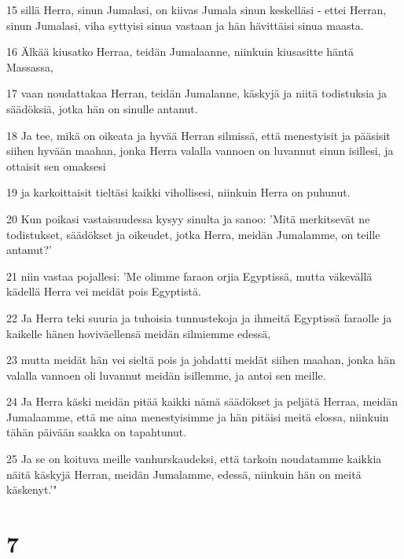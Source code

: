 \par 15 sillä Herra, sinun Jumalasi, on kiivas Jumala sinun keskelläsi - ettei Herran, sinun Jumalasi, viha syttyisi sinua vastaan ja hän hävittäisi sinua maasta.
\par 16 Älkää kiusatko Herraa, teidän Jumalaanne, niinkuin kiusasitte häntä Massassa,
\par 17 vaan noudattakaa Herran, teidän Jumalanne, käskyjä ja niitä todistuksia ja säädöksiä, jotka hän on sinulle antanut.
\par 18 Ja tee, mikä on oikeata ja hyvää Herran silmissä, että menestyisit ja pääsisit siihen hyvään maahan, jonka Herra valalla vannoen on luvannut sinun isillesi, ja ottaisit sen omaksesi
\par 19 ja karkoittaisit tieltäsi kaikki vihollisesi, niinkuin Herra on puhunut.
\par 20 Kun poikasi vastaisuudessa kysyy sinulta ja sanoo: 'Mitä merkitsevät ne todistukset, säädökset ja oikeudet, jotka Herra, meidän Jumalamme, on teille antanut?'
\par 21 niin vastaa pojallesi: 'Me olimme faraon orjia Egyptissä, mutta väkevällä kädellä Herra vei meidät pois Egyptistä.
\par 22 Ja Herra teki suuria ja tuhoisia tunnustekoja ja ihmeitä Egyptissä faraolle ja kaikelle hänen hoviväellensä meidän silmiemme edessä,
\par 23 mutta meidät hän vei sieltä pois ja johdatti meidät siihen maahan, jonka hän valalla vannoen oli luvannut meidän isillemme, ja antoi sen meille.
\par 24 Ja Herra käski meidän pitää kaikki nämä säädökset ja peljätä Herraa, meidän Jumalaamme, että me aina menestyisimme ja hän pitäisi meitä elossa, niinkuin tähän päivään saakka on tapahtunut.
\par 25 Ja se on koituva meille vanhurskaudeksi, että tarkoin noudatamme kaikkia näitä käskyjä Herran, meidän Jumalamme, edessä, niinkuin hän on meitä käskenyt.'"

\chapter{7}


